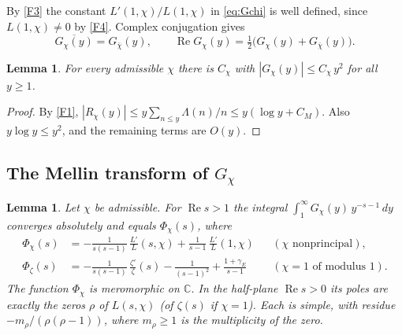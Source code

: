 \documentclass[11pt]{amsart}
\newcommand{\CC}{\mathbb{C}}
\newcommand{\re}{\operatorname{Re}}
\newcommand{\gE}{\gamma_{E}}
\theoremstyle{plain}
\newtheorem{lemma}[theorem]{Lemma}
\theoremstyle{definition}
\numberwithin{equation}{section}
\begin{document}
By \ref{F3} the constant $L'(1,\chi)/L(1,\chi)$ in \eqref{eq:Gchi} is well defined, since
$L(1,\chi)\neq0$ by \ref{F4}. Complex conjugation gives
\begin{equation}\label{eq:conj}
\overline{G_\chi(y)}=G_{\bar\chi}(y),\qquad \re G_\chi(y)=\tfrac12\bigl(G_\chi(y)+G_{\bar\chi}(y)\bigr).
\end{equation}

\begin{lemma}\label{lem:growth}
For every admissible $\chi$ there is $C_\chi$ with $|G_\chi(y)|\le C_\chi\,y^{2}$ for all $y\ge1$.
\end{lemma}

\begin{proof}
By \ref{F1}, $|R_\chi(y)|\le y\sum_{n\le y}\Lambda(n)/n\le y(\log y+C_M)$. Also $y\log y\le y^2$,
and the remaining terms are $O(y)$.
\end{proof}

\subsection{The Mellin transform of \texorpdfstring{$G_\chi$}{G chi}}

\begin{lemma}\label{lem:mellin}
Let $\chi$ be admissible. For $\re s>1$ the integral $\int_1^\infty G_\chi(y)\,y^{-s-1}\,dy$
converges absolutely and equals $\Phi_\chi(s)$, where
\begin{align*}
\Phi_\chi(s)&=-\frac{1}{s(s-1)}\,\frac{L'}{L}(s,\chi)+\frac{1}{s-1}\,\frac{L'}{L}(1,\chi)
  &&(\chi\text{ nonprincipal}),\\
\Phi_\zeta(s)&=-\frac{1}{s(s-1)}\,\frac{\zeta'}{\zeta}(s)-\frac{1}{(s-1)^2}+\frac{1+\gE}{s-1}
  &&(\chi=1\text{ of modulus }1).
\end{align*}
The function $\Phi_\chi$ is meromorphic on $\CC$. In the half-plane $\re s>0$ its poles are exactly
the zeros $\rho$ of $L(s,\chi)$ (of $\zeta(s)$ if $\chi=1$). Each is simple, with residue
$-m_\rho/(\rho(\rho-1))$, where $m_\rho\ge1$ is the multiplicity of the zero.
\end{lemma}
\end{document}
